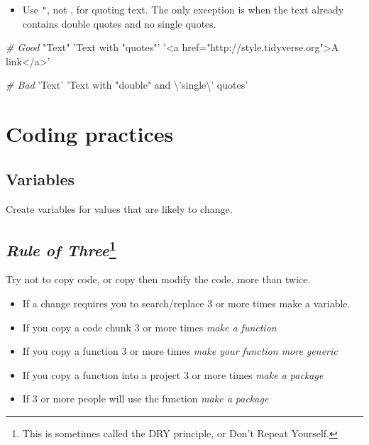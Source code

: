 \documentclass[]{book}
\newenvironment{Shaded}{\begin{snugshade}}{\end{snugshade}}
\newcommand{\CharTok}[1]{\textcolor[rgb]{0.31,0.60,0.02}{#1}}
\newcommand{\StringTok}[1]{\textcolor[rgb]{0.31,0.60,0.02}{#1}}
\newcommand{\CommentTok}[1]{\textcolor[rgb]{0.56,0.35,0.01}{\textit{#1}}}
\providecommand{\tightlist}{%
  \setlength{\itemsep}{0pt}\setlength{\parskip}{0pt}}
\let\rmarkdownfootnote\footnote%
\def\footnote{\protect\rmarkdownfootnote}
\theoremstyle{definition}
\theoremstyle{definition}
\theoremstyle{definition}
\theoremstyle{remark}
\begin{document}
\begin{itemize}
\tightlist
\item
  Use \texttt{"}, not \texttt{\textquotesingle{}}, for quoting text. The
  only exception is when the text already contains double quotes and no
  single quotes.
\end{itemize}

\begin{Shaded}
\begin{Highlighting}[]
\CommentTok{# Good}
\StringTok{"Text"}
\StringTok{'Text with "quotes"'}
\StringTok{'<a href="http://style.tidyverse.org">A link</a>'}

\CommentTok{# Bad}
\StringTok{'Text'}
\StringTok{'Text with "double" and }\CharTok{\textbackslash{}'}\StringTok{single}\CharTok{\textbackslash{}'}\StringTok{ quotes'}
\end{Highlighting}
\end{Shaded}

\section{Coding practices}\label{coding-practices}

\subsection{Variables}\label{variables}

Create variables for values that are likely to change.

\subsection[\emph{Rule of Three}]{\texorpdfstring{\emph{Rule of
Three}\footnote{This is sometimes called the DRY principle, or Don't
  Repeat Yourself.}}{Rule of Three}}\label{rule-of-threedry}

Try not to copy code, or copy then modify the code, more than twice.

\begin{itemize}
\tightlist
\item
  If a change requires you to search/replace 3 or more times make a
  variable.
\item
  If you copy a code chunk 3 or more times \emph{make a function}
\item
  If you copy a function 3 or more times \emph{make your function more
  generic}
\item
  If you copy a function into a project 3 or more times \emph{make a
  package}
\item
  If 3 or more people will use the function \emph{make a package}
\end{itemize}
\end{document}
